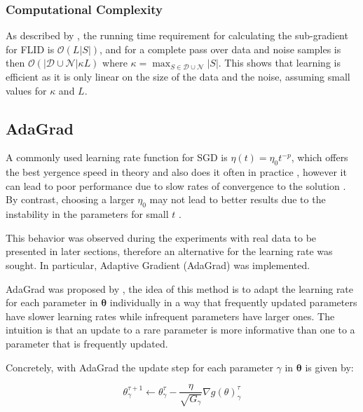 \subsubsection{Computational Complexity}

As described by \citet{tschiatschek16learning}, the running time requirement for calculating the sub-gradient for FLID is $\mathcal{O}(L|S|)$, and for a complete pass over data and noise samples is then $\mathcal{O}(|\mathcal{D}\cup\mathcal{N}|\kappa L)$ where $\kappa = \max_{S \in \mathcal{D}\cup\mathcal{N}}{|S|}$. This shows that learning is efficient as it is only linear on the size of the data and the noise, assuming small values for $\kappa$ and $L$.

\subsection{AdaGrad}
\label{sec:adagrad}

A commonly used learning rate function for SGD is $\eta(t) = \eta_{0}t^{-p}$, which offers the best yergence speed in theory and also does it often in practice \citep{bottou2012stochastic}, however it can lead to poor performance due to slow rates of convergence to the solution \citep{darken1992towards}. By contrast, choosing a larger $\eta_{0}$ may not lead to better results due to the instability in the parameters for small $t$ \citep{Darken1990}. 

This behavior was observed during the experiments with real data to be presented in later sections, therefore an alternative for the learning rate was sought. In particular, Adaptive Gradient (AdaGrad) was implemented.

AdaGrad was proposed by \citet{Duchi2011adagrad}, the idea of this method is to adapt the learning rate for each parameter in $\boldsymbol{\theta}$ individually in a way that frequently updated parameters have slower learning rates while infrequent parameters have larger ones. The intuition is that an update to a rare parameter is more informative than one to a parameter that is frequently updated.

Concretely, with AdaGrad the update step for each parameter $\gamma$ in $\boldsymbol{\theta}$ is given by:

\begin{equation}
\theta^{\tau + 1}_{\gamma} \leftarrow \theta^{\tau}_{\gamma} - \frac{\eta}{\sqrt{G_{\gamma}}} \nabla g(\theta)^{\tau}_{\gamma}
\end{equation}

